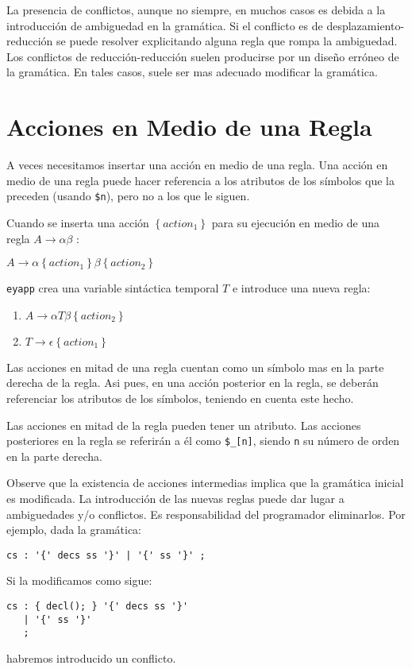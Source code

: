 La presencia de conflictos, aunque no siempre, en muchos casos es debida
a la introducción de ambiguedad en la gramática. Si el conflicto 
es de desplazamiento-reducción se puede resolver explicitando 
alguna regla que rompa la ambiguedad. Los conflictos de
reducción-reducción suelen producirse por un diseño erróneo
de la gramática. En tales casos, suele ser mas adecuado
modificar la gramática.

\section{Acciones en Medio de una Regla}
\label{section:mediaregla}
A veces necesitamos insertar una acción en medio de una regla.
Una acción en medio de una regla puede hacer referencia a los atributos de
los símbolos que la preceden (usando \verb|$n|), pero no a los que le siguen.

Cuando se  inserta una acción $\left \{ action_1\right \}$
para su ejecución en medio de una regla $A \rightarrow \alpha
\beta$ :
\begin{center}
$A \rightarrow \alpha \left \{ action_1 \right \} \beta \left \{ action_2\right \}$ 
\end{center}
\verb|eyapp| crea una variable sintáctica temporal $T$ e introduce una nueva regla:

\begin{center}
\begin{enumerate}
\item
$A \rightarrow \alpha T \beta \left \{ action_2\right \}$ 
\item
$T \rightarrow \epsilon \left \{ action_1 \right \}$ 
\end{enumerate}
\end{center}

Las acciones en mitad de una regla cuentan como un símbolo mas en la parte 
derecha de la regla. Asi pues, en una acción posterior en la regla,
se deberán referenciar los  atributos de los símbolos, teniendo en cuenta este hecho.

Las acciones en mitad de la regla pueden tener un atributo. 
Las acciones posteriores
en la regla se referirán a él como \verb|$_[n]|, siendo \verb|n| su número de orden
en la parte derecha. 

Observe que la existencia de acciones intermedias 
implica que la gramática inicial es modificada. La introducción  de las nuevas 
reglas puede dar lugar a ambiguedades y/o conflictos. Es responsabilidad
del programador eliminarlos.
Por ejemplo, dada la gramática:
\begin{verbatim}
cs : '{' decs ss '}' | '{' ss '}' ;
\end{verbatim}
Si la modificamos como sigue:
\begin{verbatim}
cs : { decl(); } '{' decs ss '}' 
   | '{' ss '}' 
   ;
\end{verbatim}
habremos introducido un conflicto.

